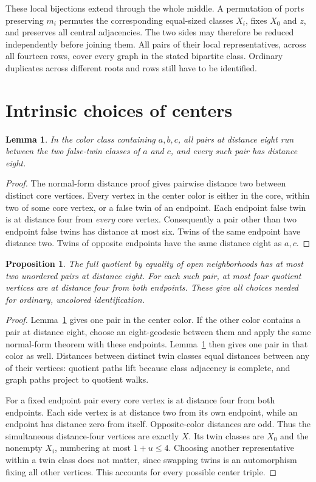 \documentclass[11pt]{article}
\newtheorem{lemma}[theorem]{Lemma}
\newtheorem{proposition}[theorem]{Proposition}
\begin{document}
These local bijections extend through the whole middle. A permutation of
ports preserving $m_i$ permutes the corresponding equal-sized classes
$X_i$, fixes $X_0$ and $z$, and preserves all central adjacencies. The
two sides may therefore be reduced independently before joining them.
All pairs of their local representatives, across all fourteen rows,
cover every graph in the stated bipartite class. Ordinary duplicates
across different roots and rows still have to be identified.

\section*{Intrinsic choices of centers}

\begin{lemma}\label{diametral}
In the color class containing $a,b,c$, all pairs at distance eight run
between the two false-twin classes of $a$ and $c$, and every such pair
has distance eight.
\end{lemma}
\begin{proof}
The normal-form distance proof gives pairwise distance two between
distinct core vertices. Every vertex in the center color is either in
the core, within two of some core vertex, or a false twin of an endpoint.
Each endpoint false twin is at distance four from \emph{every} core
vertex. Consequently a pair other than two endpoint false twins has
distance at most six. Twins of the same endpoint have distance two.
Twins of opposite endpoints have the same distance eight as $a,c$.
\end{proof}

\begin{proposition}\label{roots}
The full quotient by equality of open neighborhoods has at most two
unordered pairs at distance eight. For each such pair, at most four
quotient vertices are at distance four from both endpoints. These give
all choices needed for ordinary, uncolored identification.
\end{proposition}
\begin{proof}
Lemma~\ref{diametral} gives one pair in the center color. If the other
color contains a pair at distance eight, choose an eight-geodesic between
them and apply the same normal-form theorem with these endpoints.
Lemma~\ref{diametral} then gives one pair in that color as well. Distances
between distinct twin classes equal distances between any of their
vertices: quotient paths lift because class adjacency is complete, and
graph paths project to quotient walks.

For a fixed endpoint pair every core vertex is at distance four from
both endpoints. Each side vertex is at distance two from its own
endpoint, while an endpoint has distance zero from itself. Opposite-color
distances are odd. Thus the simultaneous distance-four vertices are
exactly $X$. Its twin classes are $X_0$ and the nonempty $X_i$, numbering
at most $1+u\leq4$. Choosing another representative within a twin class
does not matter, since swapping twins is an automorphism fixing all
other vertices. This accounts for every possible center triple.
\end{proof}
\end{document}
